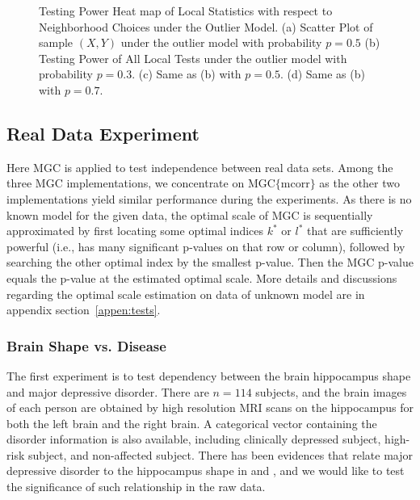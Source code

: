 \documentclass[11pt]{article}
\begin{document}
\begin{figure}[htbp]
{}
\hfil
{}
\caption{Testing Power Heat map of Local Statistics with respect to Neighborhood Choices under the Outlier Model.
(a) Scatter Plot of sample $(X,Y)$ under the outlier model with probability $p=0.5$
(b) Testing Power of All Local Tests under the outlier model with probability $p=0.3$.
(c) Same as (b) with $p=0.5$.
(d) Same as (b) with $p=0.7$.
}
\label{figSim3}
\end{figure}

\subsection{Real Data Experiment}
\label{numer3}
Here MGC is applied to test independence between real data sets. Among the three MGC implementations, we concentrate on MGC$\{$mcorr$\}$ as the other two implementations yield similar performance during the experiments. As there is no known model for the given data, the optimal scale of MGC is sequentially approximated by first locating some optimal indices $k^{*}$ or $l^{*}$ that are sufficiently powerful (i.e., has many significant p-values on that row or column), followed by searching the other optimal index by the smallest p-value. Then the MGC p-value equals the p-value at the estimated optimal scale. More details and discussions regarding the optimal scale estimation on data of unknown model are in appendix section~\ref{appen:tests}.

\subsubsection{Brain Shape vs. Disease}

The first experiment is to test dependency between the brain hippocampus shape and major depressive disorder. There are $n=114$ subjects, and the brain images of each person are obtained by high resolution MRI scans on the hippocampus for both the left brain and the right brain. A categorical vector containing the disorder information is also available, including clinically depressed subject, high-risk subject, and non-affected subject. There has been evidences that relate major depressive disorder to the hippocampus shape in \cite{ParkEtAl2011} and \cite{PosenerEtAl2003}, and we would like to test the significance of such relationship in the raw data. 
\end{document}
